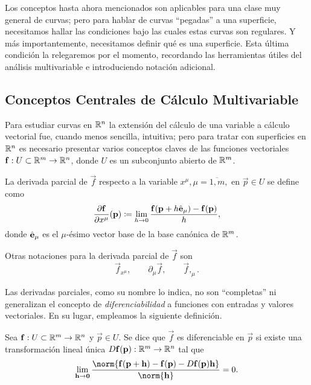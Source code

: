 Los conceptos hasta ahora mencionados son aplicables para una clase muy general de curvas; pero para hablar de curvas ``pegadas'' a una superficie, necesitamos hallar las condiciones bajo las cuales estas curvas son regulares. Y más importantemente, necesitamos definir qué es una superficie. Esta última condición la relegaremos por el momento, recordando las herramientas útiles del análisis multivariable e introduciendo notación adicional.

\subsection{Conceptos Centrales de Cálculo Multivariable}
Para estudiar curvas en $\mathbb R^n$ la extensión del cálculo de una variable a cálculo vectorial fue, cuando menos sencilla, intuitiva; pero para tratar con superficies en $\mathbb R^n$ es necesario presentar varios conceptos claves de las funciones vectoriales $\mathbf f : U \subset \mathbb R^m \to \mathbb R^n$, donde $U$ es un subconjunto abierto de $\mathbb R^m$.

\begin{definition}
	La derivada parcial de $\vec f$ respecto a la variable $x^\mu, \mu = \overline{1, m},$ en $\vec p \in U$ se define como
	\begin{equation}
		\frac{\partial  \mathbf f}{\partial x^\mu}(\mathbf p) \coloneqq \lim_{h \to 0} \frac{\mathbf f(\mathbf p + h\hat{\mathbf{e}}_{\mu}) - \mathbf f(\mathbf p)}{h},
	\end{equation}
	donde $\hat{\mathbf{e}}_{\mu}$ es el $\mu$-ésimo vector base de la base canónica de $\mathbb R^m$.
\end{definition}
Otras notaciones para la derivada parcial de $\vec f$ son
\begin{equation}
	\vec f_{x^\mu}, \qquad \partial_\mu \vec f, \qquad \vec f,_{\mu}.
\end{equation}

Las derivadas parciales, como su nombre lo indica, no son ``completas'' ni generalizan el concepto de \emph{diferenciabilidad} a funciones con entradas y valores vectoriales. En su lugar, empleamos la siguiente definición.
\begin{definition}
	Sea $\mathbf f : U \subset \mathbb R^m \to \mathbb R^n$ y $\vec p \in U$. Se dice que $\vec f$ es diferenciable en $\vec p$ si existe una transformación lineal única $D\mathbf f(\mathbf p) : \mathbb R^m \to \mathbb R^n$ tal que
	\begin{equation}
		\lim_{\vec h \to \vec 0}\frac{\norm{\vec f(\vec p + \vec h) - \vec f(\vec p) - D\vec f(\vec p)\vec h}}{\norm{\vec h}} = 0.
	\end{equation}
\end{definition}


